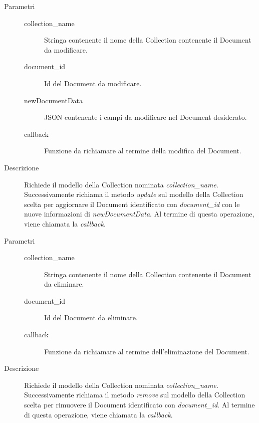 \begin{description}
\begin{mldescription}
		\begin{description}
			\item[Parametri] \hfill
				\begin{description}
					\item[collection\_name] \hfill
					Stringa contenente il nome della Collection contenente il Document da modificare.
					\item[document\_id] \hfill
					Id del Document da modificare.
					\item[newDocumentData] \hfill
					JSON contenente i campi da modificare nel Document desiderato.					
					\item[callback] \hfill
					Funzione da richiamare al termine della modifica del Document.
				\end{description}
			\item[Descrizione] \hfill
			Richiede il modello della Collection nominata \textit{collection\_name}. Successivamente richiama
			il metodo \textit{update} sul modello della Collection scelta per aggiornare il Document identificato con \textit{document\_id} con le nuove informazioni di \textit{newDocumentData}. Al termine di questa operazione, viene chiamata la \textit{callback}.
		\end{description}
	
	 \hfill 
		\begin{description}
			\item[Parametri] \hfill
				\begin{description}
					\item[collection\_name] \hfill
					Stringa contenente il nome della Collection contenente il Document da eliminare.
					\item[document\_id] \hfill
					Id del Document da eliminare.
					\item[callback] \hfill
					Funzione da richiamare al termine dell'eliminazione del Document.
				\end{description}
			\item[Descrizione] \hfill
Richiede il modello della Collection nominata \textit{collection\_name}. Successivamente richiama
il metodo \textit{remove} sul modello della Collection scelta per rimuovere il Document identificato con \textit{document\_id}. Al termine di questa 	operazione, viene chiamata la \textit{callback}.
		\end{description}
		
\end{mldescription}

\end{description}

